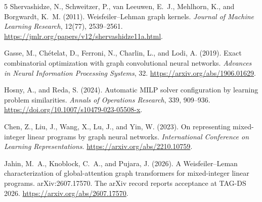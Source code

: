 \documentclass[10pt]{article}
\begin{document}
\begin{thebibliography}{5}
Shervashidze, N., Schweitzer, P., van Leeuwen, E.~J., Mehlhorn, K.,
and Borgwardt, K.~M. (2011).
Weisfeiler--Lehman graph kernels.
\emph{Journal of Machine Learning Research}, 12(77), 2539--2561.
\url{https://jmlr.org/papers/v12/shervashidze11a.html}.

Gasse, M., Ch\'{e}telat, D., Ferroni, N., Charlin, L., and Lodi, A. (2019).
Exact combinatorial optimization with graph convolutional neural networks.
\emph{Advances in Neural Information Processing Systems}, 32.
\url{https://arxiv.org/abs/1906.01629}.

Hosny, A., and Reda, S. (2024).
Automatic MILP solver configuration by learning problem similarities.
\emph{Annals of Operations Research}, 339, 909--936.
\url{https://doi.org/10.1007/s10479-023-05508-x}.

Chen, Z., Liu, J., Wang, X., Lu, J., and Yin, W. (2023).
On representing mixed-integer linear programs by graph neural networks.
\emph{International Conference on Learning Representations}.
\url{https://arxiv.org/abs/2210.10759}.

Jahin, M.~A., Knoblock, C.~A., and Pujara, J. (2026).
A Weisfeiler--Leman characterization of global-attention graph transformers
for mixed-integer linear programs.
arXiv:2607.17570. The arXiv record reports acceptance at TAG-DS 2026.
\url{https://arxiv.org/abs/2607.17570}.
\end{thebibliography}
\end{document}
